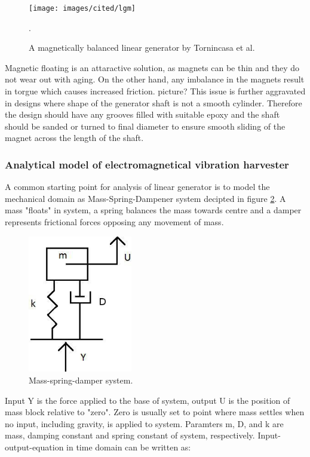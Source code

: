 \begin{figure}[htb]
\begin{center}
\texttt{[image: images/cited/lgm]}
\end{center}
\caption{A magnetically balanced linear generator by Tornincasa et al. \cite{Tornincasa2012}}.
\label{lgm}
\end{figure}

Magnetic floating is an attaractive solution, as magnets can be thin and they do not wear out with aging. On the other hand, any imbalance in the magnets result in torgue which causes increased friction. {\color{yellow} picture?} This issue is further aggravated in designs where shape of the generator shaft is not a smooth cylinder. Therefore the design should have any grooves filled with suitable epoxy and the shaft should be sanded or turned to final diameter to ensure smooth sliding of the magnet across the length of the shaft.

\subsubsection{Analytical model of electromagnetical vibration harvester}
A common starting point for analysis of linear generator is to model the mechanical domain as Mass-Spring-Dampener system decipted in figure \ref{MSD}. A mass "floats" in system, a spring balances the mass towards centre and a damper represents frictional forces opposing any movement of mass. 

\begin{figure}[htb]
\begin{center}
\includegraphics[height=6cm]{images/own_dwg/MSD.jpg}
\end{center}
\caption{\label{MSD} Mass-spring-damper system.}
\end{figure}

Input Y is the force applied to the base of system, output U is the position of mass block relative to "zero". Zero is usually set to point where mass settles when no input, including gravity, is applied to system. Paramters m, D, and k are mass, damping constant and spring constant of system, respectively. Input-output-equation in time domain can be written as: 

